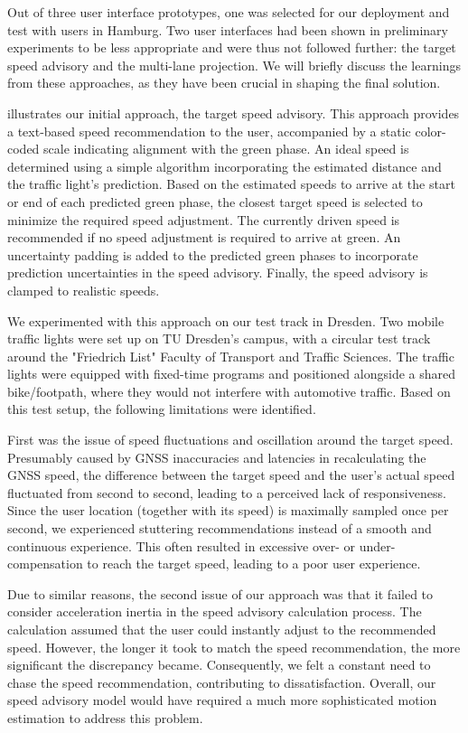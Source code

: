 Out of three user interface prototypes, one was selected for our deployment and test with users in Hamburg. Two user interfaces had been shown in preliminary experiments to be less appropriate and were thus not followed further: the target speed advisory and the multi-lane projection. We will briefly discuss the learnings from these approaches, as they have been crucial in shaping the final solution.

 illustrates our initial approach, the target speed advisory. This approach provides a text-based speed recommendation to the user, accompanied by a static color-coded scale indicating alignment with the green phase. An ideal speed is determined using a simple algorithm incorporating the estimated distance and the traffic light's prediction. Based on the estimated speeds to arrive at the start or end of each predicted green phase, the closest target speed is selected to minimize the required speed adjustment. The currently driven speed is recommended if no speed adjustment is required to arrive at green. An uncertainty padding is added to the predicted green phases to incorporate prediction uncertainties in the speed advisory. Finally, the speed advisory is clamped to realistic speeds.

We experimented with this approach on our test track in Dresden. Two mobile traffic lights were set up on TU Dresden's campus, with a circular test track around the "Friedrich List" Faculty of Transport and Traffic Sciences. The traffic lights were equipped with fixed-time programs and positioned alongside a shared bike/footpath, where they would not interfere with automotive traffic. Based on this test setup, the following limitations were identified.

First was the issue of speed fluctuations and oscillation around the target speed. Presumably caused by GNSS inaccuracies and latencies in recalculating the GNSS speed, the difference between the target speed and the user's actual speed fluctuated from second to second, leading to a perceived lack of responsiveness. Since the user location (together with its speed) is maximally sampled once per second, we experienced stuttering recommendations instead of a smooth and continuous experience. This often resulted in excessive over- or under-compensation to reach the target speed, leading to a poor user experience.

Due to similar reasons, the second issue of our approach was that it failed to consider acceleration inertia in the speed advisory calculation process. The calculation assumed that the user could instantly adjust to the recommended speed. However, the longer it took to match the speed recommendation, the more significant the discrepancy became. Consequently, we felt a constant need to chase the speed recommendation, contributing to dissatisfaction. Overall, our speed advisory model would have required a much more sophisticated motion estimation to address this problem.

